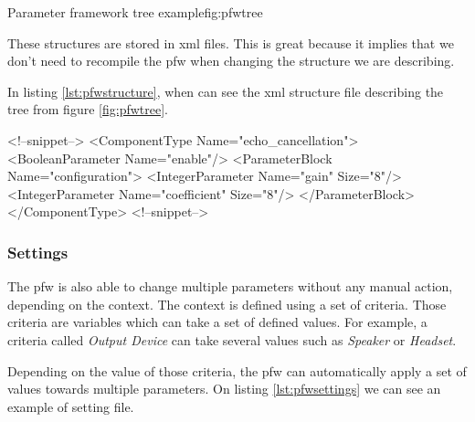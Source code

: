 \begin{figureGraphics}{Parameter framework tree example}{fig:pfwtree}
\end{figureGraphics}

These structures are stored in \gls{xml} files. This is great because it implies that we don't need
to recompile the \gls{pfw} when changing the structure we are describing.

In listing \ref{lst:pfwstructure}, when can see the \gls{xml} structure file
describing the tree from figure \ref{fig:pfwtree}.

\begin{code}[language=pfwXml, caption=Structure file example snippet, label=lst:pfwstructure]
<!--snippet-->
<ComponentType Name="echo_cancellation">
    <BooleanParameter Name="enable"/>
    <ParameterBlock Name="configuration">
        <IntegerParameter Name="gain" Size="8"/>
        <IntegerParameter Name="coefficient" Size="8"/>
    </ParameterBlock>
</ComponentType>
<!--snippet-->
\end{code}

\subsubsection{Settings}
The \gls{pfw} is also able to change multiple parameters without any manual action, depending on the context.
The context is defined using a set of criteria. Those criteria are variables which can take a set of defined values.
For example, a criteria called \emph{Output Device} can take several values such as \emph{Speaker} or \emph{Headset}.

Depending on the value of those criteria, the \gls{pfw} can automatically apply a set of values towards
multiple parameters.
On listing \ref{lst:pfwsettings} we can see an example of setting file.

